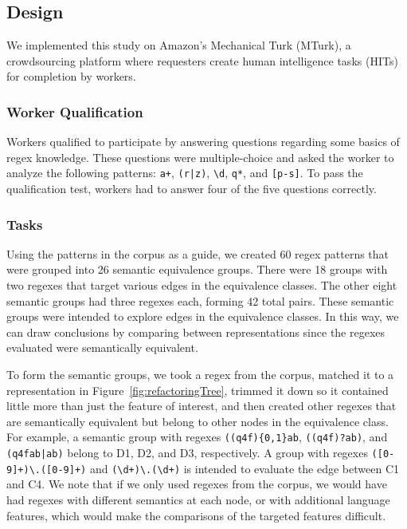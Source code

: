 


\subsection{Design}
We implemented this study on  Amazon's Mechanical Turk (MTurk),  a crowdsourcing platform where requesters create human intelligence tasks (HITs) for completion by workers. 

\subsubsection{Worker Qualification}
Workers qualified to participate  by answering questions regarding some basics of regex knowledge. These questions were multiple-choice and asked the worker to analyze the following patterns: \verb!a+!, \verb!(r|z)!, \verb!\d!, \verb!q*!, and \verb![p-s]!. To pass the qualification test, workers had to answer four of the five questions correctly.

\subsubsection{Tasks}
Using the patterns in the corpus as a guide, we created 60 regex patterns that were grouped into 26 semantic equivalence groups. 
 There were 18 groups with two regexes that target various edges in the equivalence classes. 
The other eight semantic groups had three regexes each, forming 42 total pairs. 
These semantic groups were intended to explore edges in the equivalence classes. In this way, we can draw conclusions by comparing between representations since the regexes evaluated were semantically equivalent. 

To form the semantic groups, we took a regex from the corpus, matched it to a representation in Figure~\ref{fig:refactoringTree}, trimmed it down so it contained little more than just the feature of interest, and then created other regexes that are semantically equivalent but belong to other nodes in the equivalence class. For example, a semantic group with regexes \verb!((q4f){0,1}ab!, \verb!((q4f)?ab)!, and \verb!(q4fab|ab)! belong to D1, D2, and D3, respectively. 
A  group with regexes \verb!([0-9]+)\.([0-9]+)! and  \verb!(\d+)\.(\d+)! is intended to evaluate the edge between C1 and C4.
We note that if we only used regexes from the corpus, we would have had regexes with different semantics at each node, or with additional language features, which would make the comparisons of the targeted features  difficult. 




